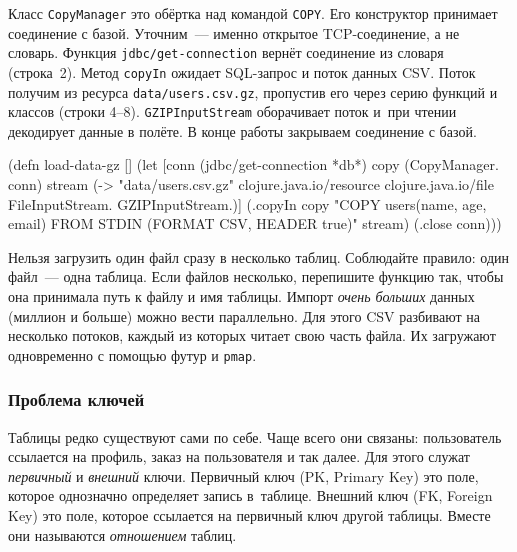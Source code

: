 Класс \verb|CopyManager| это обёртка над командой \verb|COPY|. Его конструктор
принимает соединение с базой. Уточним~--- именно открытое TCP-соединение, а не
словарь. Функция \verb|jdbc/get-connection| вернёт соединение из словаря
(строка~2). Метод \verb|copyIn| ожидает SQL-запрос и поток данных CSV. Поток
получим из ресурса \verb|data/users.csv.gz|, пропустив его через серию функций и
классов (строки 4--8). \verb|GZIPInputStream| оборачивает поток и~при чтении
декодирует данные в полёте. В конце работы закрываем соединение с базой.


\begin{english}
  \begin{clojure/lines}
(defn load-data-gz []
  (let [conn (jdbc/get-connection *db*)
        copy (CopyManager. conn)
        stream (-> "data/users.csv.gz"
                   clojure.java.io/resource
                   clojure.java.io/file
                   FileInputStream.
                   GZIPInputStream.)]
    (.copyIn copy "COPY users(name, age, email)
                   FROM STDIN (FORMAT CSV, HEADER true)"
             stream)
    (.close conn)))
  \end{clojure/lines}
\end{english}

Нельзя загрузить один файл сразу в несколько таблиц. Соблюдайте правило: один
файл~--- одна таблица. Если файлов несколько, перепишите функцию так, чтобы она
принимала путь к файлу и имя таблицы. Импорт \emph{очень больших} данных
(миллион и больше) можно вести параллельно. Для этого CSV разбивают на несколько
потоков, каждый из которых читает свою часть файла. Их загружают одновременно с
помощью футур и \verb|pmap|.

\subsubsection*{Проблема ключей}



Таблицы редко существуют сами по себе. Чаще всего они связаны: пользователь
ссылается на профиль, заказ на пользователя и так далее. Для этого служат
\emph{первичный} и \emph{внешний} ключи. Первичный ключ (PK, Primary Key) это
поле, которое однозначно определяет запись в~таблице. Внешний ключ (FK, Foreign
Key) это поле, которое ссылается на первичный ключ другой таблицы. Вместе они
называются \emph{отношением} таблиц.


